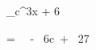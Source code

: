 \documentclass{article}
\begin{document}
\int_{c}^{3}{x + 6}

= \ \  - \ 6c\  + \ 27
\end{document}
